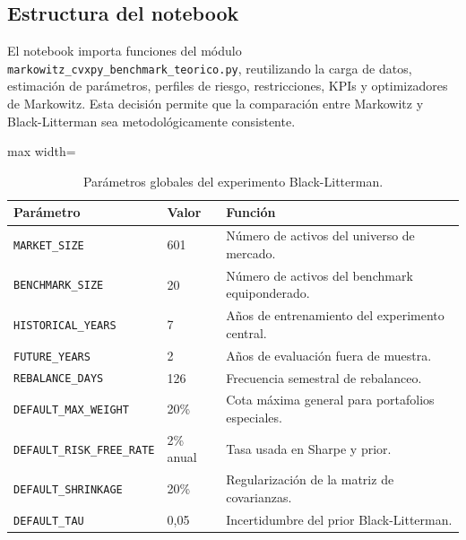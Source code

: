 \subsection*{Estructura del notebook}

El notebook importa funciones del m\'odulo
\texttt{markowitz\_cvxpy\_benchmark\_teorico.py}, reutilizando la carga de
datos, estimaci\'on de par\'ametros, perfiles de riesgo, restricciones, KPIs y
optimizadores de Markowitz. Esta decisi\'on permite que la comparaci\'on entre
Markowitz y Black-Litterman sea metodol\'ogicamente consistente.

\begin{table}[H]
\centering
\caption{Par\'ametros globales del experimento Black-Litterman.}
\label{tab:anexo4_bl_parametros_globales}
\small
\begin{adjustbox}{max width=\textwidth}
\begin{tabular}{@{}p{}p{}p{}@{}}
\toprule
Par\'ametro & Valor & Funci\'on \\
\midrule
\texttt{MARKET\_SIZE} & 601 & N\'umero de activos del universo de mercado. \\
\texttt{BENCHMARK\_SIZE} & 20 & N\'umero de activos del benchmark equiponderado. \\
\texttt{HISTORICAL\_YEARS} & 7 & A\~nos de entrenamiento del experimento central. \\
\texttt{FUTURE\_YEARS} & 2 & A\~nos de evaluaci\'on fuera de muestra. \\
\texttt{REBALANCE\_DAYS} & 126 & Frecuencia semestral de rebalanceo. \\
\texttt{DEFAULT\_MAX\_WEIGHT} & 20\% & Cota m\'axima general para portafolios especiales. \\
\texttt{DEFAULT\_RISK\_FREE\_RATE} & 2\% anual & Tasa usada en Sharpe y prior. \\
\texttt{DEFAULT\_SHRINKAGE} & 20\% & Regularizaci\'on de la matriz de covarianzas. \\
\texttt{DEFAULT\_TAU} & 0,05 & Incertidumbre del prior Black-Litterman. \\
\bottomrule
\end{tabular}
\end{adjustbox}
\end{table}

